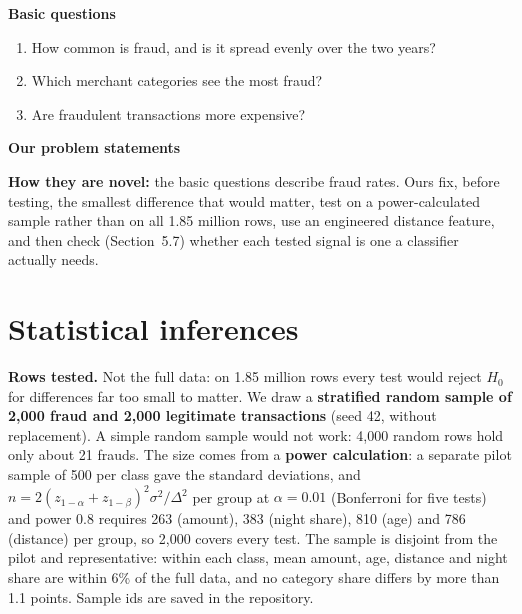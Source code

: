 \documentclass[10pt,a4paper,twocolumn]{article}
\newcommand{\minihead}[1]{\par\needspace{8\baselineskip}\smallskip\textbf{#1}\par}
\begin{document}
\minihead{Basic questions}
\begin{enumerate}[label=\arabic*.]
  \item How common is fraud, and is it spread evenly over the two years?
  \item Which merchant categories see the most fraud?
  \item Are fraudulent transactions more expensive?
\end{enumerate}

\minihead{Our problem statements}
\noindent{}

\textbf{How they are novel:} the basic questions describe fraud rates. Ours fix, before testing, the
smallest difference that would matter, test on a power-calculated sample rather than on all 1.85
million rows, use an engineered distance feature, and then check (Section~5.7) whether each tested
signal is one a classifier actually needs.

\section{Statistical inferences}

\textbf{Rows tested.} Not the full data: on 1.85 million rows every test would reject $H_0$ for
differences far too small to matter. We draw a \textbf{stratified random sample of 2{,}000 fraud and
2{,}000 legitimate transactions} (seed 42, without replacement). A simple random sample would not
work: 4{,}000 random rows hold only about 21 frauds. The size comes from a \textbf{power
calculation}: a separate pilot sample of 500 per class gave the standard deviations, and
$n=2(z_{1-\alpha}+z_{1-\beta})^2\sigma^2/\Delta^2$ per group at $\alpha=0.01$ (Bonferroni for five
tests) and power $0.8$ requires 263 (amount), 383 (night share), 810 (age) and 786 (distance) per
group, so 2{,}000 covers every test. The sample is disjoint from the pilot and representative: within
each class, mean amount, age, distance and night share are within 6\% of the full data, and no
category share differs by more than 1.1 points. Sample ids are saved in the repository.
\end{document}
